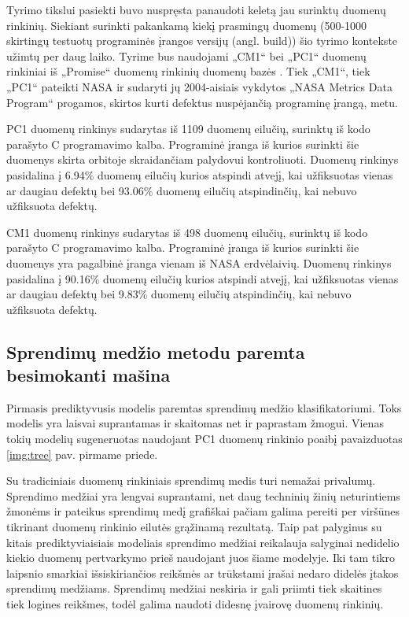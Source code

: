 \documentclass{VUMIFPSbakalaurinis}
\begin{document}
Tyrimo tikslui pasiekti buvo nuspręsta panaudoti keletą jau surinktų duomenų rinkinių. Siekiant surinkti pakankamą kiekį prasmingų duomenų (500-1000 skirtingų testuotų programinės įrangos versijų (angl. build)) šio tyrimo kontekste užimtų per daug laiko. Tyrime bus naudojami  „CM1“ bei „PC1“ duomenų rinkiniai iš  „Promise“ duomenų rinkinių duomenų bazės \cite{Sayyad-Shirabad+Menzies:2005}. Tiek „CM1“, tiek „PC1“ pateikti NASA ir sudaryti jų 2004-aisiais vykdytos „NASA Metrics Data Program“ progamos, skirtos kurti defektus nuspėjančią programinę įrangą, metu.

PC1 duomenų rinkinys sudarytas iš 1109 duomenų eilučių, surinktų iš kodo parašyto C programavimo kalba. Programinė įranga iš kurios surinkti šie duomenys skirta orbitoje skraidančiam palydovui kontroliuoti. Duomenų rinkinys pasidalina į 6.94\% duomenų eilučių kurios atspindi atvejį, kai užfiksuotas vienas ar daugiau defektų bei 93.06\% duomenų eilučių atspindinčių, kai nebuvo užfiksuota defektų.

CM1 duomenų rinkinys sudarytas iš 498 duomenų eilučių, surinktų iš kodo parašyto C programavimo kalba. Programinė įranga iš kurios surinkti šie duomenys yra pagalbinė įranga vienam iš NASA erdvėlaivių. Duomenų rinkinys pasidalina į 90.16\% duomenų eilučių kurios atspindi atvejį, kai užfiksuotas vienas ar daugiau defektų bei 9.83\% duomenų eilučių atspindinčių, kai nebuvo užfiksuota defektų.

\subsection{Sprendimų medžio metodu paremta besimokanti mašina}
Pirmasis prediktyvusis modelis paremtas sprendimų medžio klasifikatoriumi. Toks modelis yra laisvai suprantamas ir skaitomas net ir paprastam žmogui. Vienas tokių modelių sugeneruotas naudojant PC1 duomenų rinkinio poaibį pavaizduotas \ref{img:tree} pav. pirmame priede. 

Su tradiciniais duomenų rinkiniais sprendimų medis turi nemažai privalumų. Sprendimo medžiai yra lengvai suprantami, net daug techninių žinių neturintiems žmonėms ir pateikus sprendimų medį grafiškai pačiam galima pereiti per viršūnes tikrinant duomenų rinkinio eilutės grąžinamą rezultatą. Taip pat palyginus su kitais prediktyviaisiais modeliais sprendimo medžiai reikalauja salyginai nedidelio kiekio duomenų pertvarkymo prieš naudojant juos šiame modelyje. Iki tam tikro laipsnio smarkiai išsiskiriančios reikšmės ar trūkstami įrašai nedaro didelės įtakos sprendimų medžiams. Sprendimų medžiai neskiria ir gali priimti tiek skaitines tiek logines reikšmes, todėl galima naudoti didesnę įvairovę duomenų rinkinių.
\end{document}
